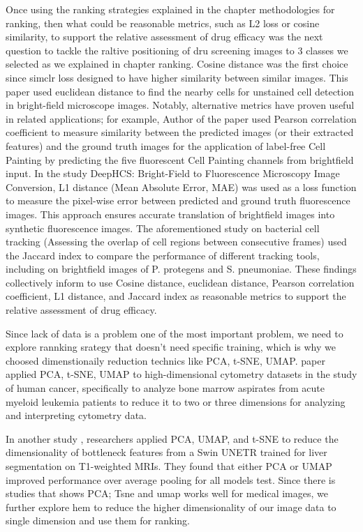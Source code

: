 Once using the ranking strategies explained in the chapter methodologies for ranking, then what could be reasonable metrics, such as L2 loss or cosine similarity, to support the relative assessment of drug efficacy was the next question to tackle the raltive positioning of dru screening images to 3 classes we selected as we explained in chapter ranking. Cosine distance was the first choice since simclr loss designed to have higher similarity between similar images. This paper \cite{Mualla2013ACD} used euclidean distance to find the nearby cells for unstained cell detection in bright-field microscope images. Notably, alternative metrics have proven useful in related applications; for example, Author of the paper \cite{CrossZamirski2022LabelFree} used Pearson correlation coefficient to measure similarity between the predicted images (or their extracted features) and the ground truth images for the application of label-free Cell Painting by predicting the five fluorescent Cell Painting channels from brightfield input.  In the study \cite{Lee2018DeepHCS}   DeepHCS: Bright-Field to Fluorescence Microscopy Image Conversion, L1 distance (Mean Absolute Error, MAE) was used as a loss function to measure the pixel-wise error between predicted and ground truth fluorescence images. This approach ensures accurate translation of brightfield images into synthetic fluorescence images. The aforementioned study \cite{Todorov2023STrack} on bacterial cell tracking (Assessing the overlap of cell regions between consecutive frames) used the Jaccard index to compare the performance of different tracking tools, including on brightfield images of P. protegens and S. pneumoniae. These findings collectively inform to use Cosine distance, euclidean distance, Pearson correlation coefficient, L1 distance, and Jaccard index as reasonable metrics to support the relative assessment of drug efficacy.

Since lack of data is a problem one of the most important problem, we need to explore rannking srategy that doesn't need specific training, which is why we choosed dimenstionaily reduction technics like PCA, t-SNE, UMAP. \cite{keyes2020cancerprimer} paper applied PCA, t-SNE, UMAP to high-dimensional cytometry datasets in the study of human cancer, specifically to analyze bone marrow aspirates from acute myeloid leukemia patients to reduce it to two or three dimensions for analyzing and interpreting cytometry data. 

In another study \cite{melba:2024:020:woodland}, researchers applied PCA, UMAP, and t-SNE to reduce the dimensionality of bottleneck features from a Swin UNETR trained for liver segmentation on T1-weighted MRIs. They found that either PCA or UMAP improved performance over average pooling for all models test. Since there is studies that shows PCA; Tsne and umap works well for medical images, we further explore hem to reduce the higher dimensionality of our image data to single dimension and use them for ranking. 
